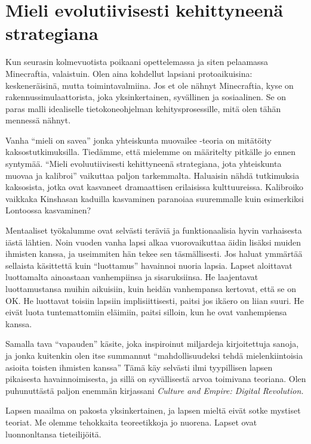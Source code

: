\section{Mieli evolutiivisesti kehittyneenä strategiana}

Kun seurasin kolmevuotista poikaani opettelemassa ja siten pelaamassa Minecraftia, valaistuin. Olen aina kohdellut lapsiani protoaikuisina: keskeneräisinä, mutta toimintavalmiina. Jos et ole nähnyt Minecraftia, kyse on rakennussimulaattorista, joka yksinkertainen, syvällinen ja sosiaalinen. Se on paras malli idealiselle tietokoneohjelman kehitysprosessille, mitä olen tähän mennessä nähnyt.

Vanha ``mieli on savea\vmq{,}'' jonka yhteiskunta muovailee -teoria on mitätöity kaksostutkimuksilla. Tiedämme, että mielemme on määritelty pitkälle jo ennen syntymää. ``Mieli evoluutiivisesti kehittyneenä strategiana, jota yhteiskunta muovaa ja kalibroi'' vaikuttaa paljon tarkemmalta. Haluaisin nähdä tutkimuksia kaksosista, jotka ovat kasvaneet dramaattisen erilaisissa kulttuureissa. Kalibroiko vaikkaka Kinshasan kaduilla kasvaminen paranoiaa suuremmalle kuin esimerkiksi Lontoossa kasvaminen?

Mentaaliset työkalumme ovat selvästi teräviä ja funktionaalisia hyvin varhaisesta iästä lähtien. Noin vuoden vanha lapsi alkaa vuorovaikuttaa äidin lisäksi muiden ihmisten kanssa, ja useimmiten hän tekee sen täsmällisesti. Jos haluat ymmärtää sellaista käsittettä kuin ``luottamus\vmq{,}'' havainnoi nuoria lapsia. Lapset aloittavat luottamalta ainoastaan vanhempiinsa ja sisaruksiinsa. He laajentavat luottamustansa muihin aikuisiin, kuin heidän vanhempansa kertovat, että se on OK. He luottavat toisiin lapsiin implisiittisesti, paitsi jos ikäero on liian suuri. He eivät luota tuntemattomiin eläimiin, paitsi silloin, kun he ovat vanhempiensa kanssa.

Samalla tava ``vapauden'' käsite, joka inspiroinut miljardeja kirjoitettuja sanoja, ja jonka kuitenkin olen itse summannut ``mahdollisuudeksi tehdä mielenkiintoisia asioita toisten ihmisten kanssa'' Tämä käy selvästi ilmi tyypillisen lapsen pikaisesta havainnoimisesta, ja sillä on syvällisestä arvoa toimivana teoriana. Olen puhunuttästä paljon enemmän kirjassani \emph{Culture and Empire: Digital Revolution.}

Lapsen maailma on pakosta yksinkertainen, ja lapsen mieltä eivät sotke mystiset teoriat. Me olemme tehokkaita teoreetikkoja jo nuorena. Lapset ovat luonnonltansa tieteilijöitä.

